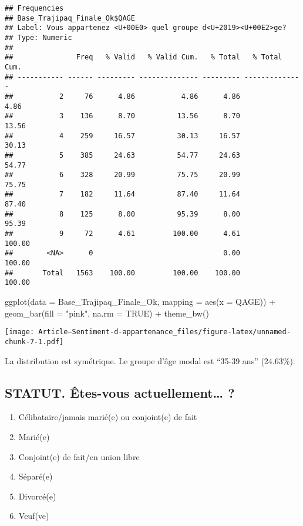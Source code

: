 \documentclass[
]{article}
\newenvironment{Shaded}{\begin{snugshade}}{\end{snugshade}}
\newcommand{\AttributeTok}[1]{\textcolor[rgb]{0.77,0.63,0.00}{#1}}
\newcommand{\ConstantTok}[1]{\textcolor[rgb]{0.00,0.00,0.00}{#1}}
\newcommand{\FunctionTok}[1]{\textcolor[rgb]{0.00,0.00,0.00}{#1}}
\newcommand{\NormalTok}[1]{#1}
\newcommand{\SpecialCharTok}[1]{\textcolor[rgb]{0.00,0.00,0.00}{#1}}
\newcommand{\StringTok}[1]{\textcolor[rgb]{0.31,0.60,0.02}{#1}}
\providecommand{\tightlist}{%
  \setlength{\itemsep}{0pt}\setlength{\parskip}{0pt}}
\begin{document}
\begin{verbatim}
## Frequencies  
## Base_Trajipaq_Finale_Ok$QAGE  
## Label: Vous appartenez <U+00E0> quel groupe d<U+2019><U+00E2>ge?  
## Type: Numeric  
## 
##               Freq   % Valid   % Valid Cum.   % Total   % Total Cum.
## ----------- ------ --------- -------------- --------- --------------
##           2     76      4.86           4.86      4.86           4.86
##           3    136      8.70          13.56      8.70          13.56
##           4    259     16.57          30.13     16.57          30.13
##           5    385     24.63          54.77     24.63          54.77
##           6    328     20.99          75.75     20.99          75.75
##           7    182     11.64          87.40     11.64          87.40
##           8    125      8.00          95.39      8.00          95.39
##           9     72      4.61         100.00      4.61         100.00
##        <NA>      0                               0.00         100.00
##       Total   1563    100.00         100.00    100.00         100.00
\end{verbatim}

\begin{Shaded}
\begin{Highlighting}[]
\FunctionTok{ggplot}\NormalTok{(}\AttributeTok{data =}\NormalTok{ Base\_Trajipaq\_Finale\_Ok, }\AttributeTok{mapping =} \FunctionTok{aes}\NormalTok{(}\AttributeTok{x =}\NormalTok{ QAGE)) }\SpecialCharTok{+}
  \FunctionTok{geom\_bar}\NormalTok{(}\AttributeTok{fill =} \StringTok{"pink"}\NormalTok{, }\AttributeTok{na.rm =} \ConstantTok{TRUE}\NormalTok{) }\SpecialCharTok{+}
  \FunctionTok{theme\_bw}\NormalTok{()}
\end{Highlighting}
\end{Shaded}

\texttt{[image: Article---Sentiment-d-appartenance\_files/figure-latex/unnamed-chunk-7-1.pdf]}

La distribution est symétrique. Le groupe d'âge modal est ``35-39 ans''
(24.63\%).

\hypertarget{statut.-uxeates-vous-actuellement}{%
\subsection{STATUT. Êtes-vous actuellement\ldots{}
?}\label{statut.-uxeates-vous-actuellement}}

\begin{enumerate}
\def\labelenumi{\arabic{enumi}.}
\tightlist
\item
  Célibataire/jamais marié(e) ou conjoint(e) de fait
\item
  Marié(e)
\item
  Conjoint(e) de fait/en union libre
\item
  Séparé(e)
\item
  Divorcé(e)
\item
  Veuf(ve)
\end{enumerate}
\end{document}
